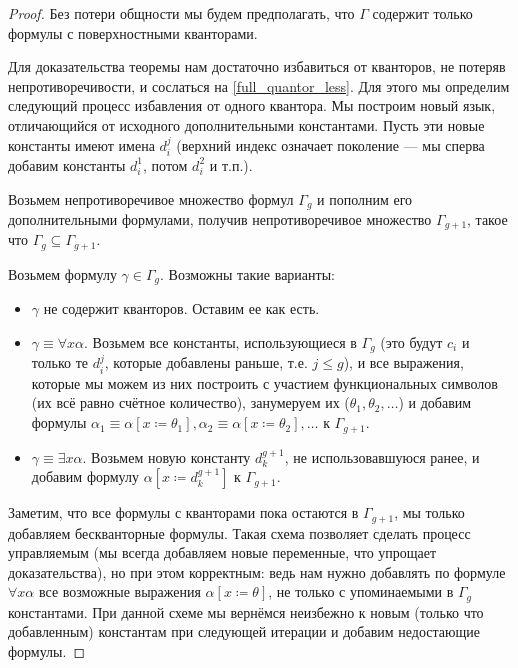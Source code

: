 \begin{proof}
Без потери общности мы будем предполагать, что $\Gamma$ содержит
только формулы с поверхностными кванторами.

Для доказательства теоремы нам достаточно 
избавиться от кванторов, не потеряв непротиворечивости, и сослаться на
\ref{full_quantor_less}. Для этого мы определим следующий процесс
избавления от одного квантора.
Мы построим новый язык, отличающийся от исходного дополнительными 
константами. Пусть эти новые константы имеют имена $d_i^j$
(верхний индекс означает поколение --- мы сперва добавим константы $d_i^1$,
потом $d_i^2$ и т.п.).

Возьмем непротиворечивое множество формул $\Gamma_g$ и пополним его
дополнительными формулами, получив непротиворечивое множество $\Gamma_{g+1}$,
такое что $\Gamma_g \subseteq \Gamma_{g+1}$. 

Возьмем формулу $\gamma \in \Gamma_g$. Возможны такие варианты:
\begin{itemize}
\item $\gamma$ не содержит кванторов. Оставим ее как есть.

\item $\gamma \equiv \forall x \alpha$.
Возьмем все константы, использующиеся в $\Gamma_g$
(это будут $c_i$ и только те $d_i^j$, которые добавлены раньше, т.е. $j \le g$), и 
все выражения, которые мы можем из них построить с участием функциональных
символов (их всё равно счётное количество), 
занумеруем их ($\theta_1, \theta_2, \dots$) и добавим формулы 
$\alpha_1 \equiv \alpha[x \coloneqq  \theta_1], \alpha_2 \equiv \alpha[x \coloneqq  \theta_2], \dots$ 
к $\Gamma_{g+1}$.

\item $\gamma \equiv \exists x \alpha$.
Возьмем новую константу $d_k^{g+1}$, не использовавшуюся ранее, и 
добавим формулу $\alpha [x \coloneqq  d_k^{g+1}]$ к $\Gamma_{g+1}$.
\end{itemize}

Заметим, что все формулы с кванторами пока остаются в $\Gamma_{g+1}$,
мы только добавляем бескванторные формулы.
Такая схема позволяет сделать процесс управляемым
(мы всегда добавляем новые переменные, что упрощает доказательства),
но при этом корректным: ведь нам нужно добавлять по формуле $\forall x \alpha$
все возможные выражения $\alpha[x \coloneqq  \theta]$, не только 
с упоминаемыми в $\Gamma_g$ константами.
При данной схеме мы вернёмся неизбежно к новым (только что добавленным) 
константам при следующей итерации и добавим недостающие формулы.


\end{proof}
